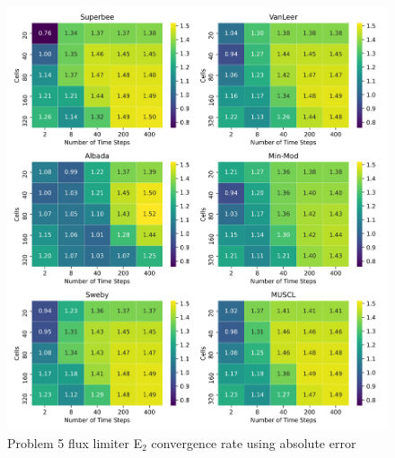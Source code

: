 \clearpage

\begin{figure}[p]
    \centering
    \includegraphics[width=6in]{images/chapter-5/progressionProblems/problem5/problem5E2FluxLimiterConvergenceRate.png}
    \caption{Problem 5 flux limiter E${}_{2}$ convergence rate using absolute error}
    \label{fig:problem5_l2error_fluxlimiter_convergence_rate}
\end{figure}